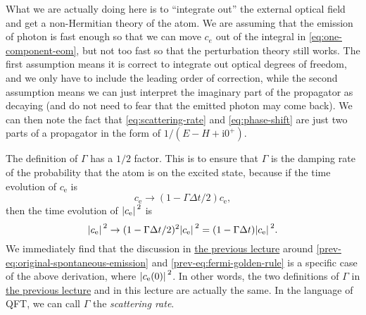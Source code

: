 \documentclass[hyperref, a4paper]{article}
\newcommand*{\ii}{\mathrm{i}}
\newcommand{\prevlecture}{\href{11-18.pdf}{the previous lecture}}
\begin{document}
\begin{note*}{}
    What we are actually doing here is to ``integrate out'' the external optical field and get a non-Hermitian
    theory of the atom. We are assuming that the emission of photon is fast enough so that 
    we can move $c_e$ out of the integral in \eqref{eq:one-component-eom}, but not too fast so that the 
    perturbation theory still works. The first assumption means it is correct to integrate out optical degrees 
    of freedom, and we only have to include the leading order of correction, while the second assumption means 
    we can just interpret the imaginary part of the propagator as decaying (and do not need to fear that the 
    emitted photon may come back). We can then note the fact that \eqref{eq:scattering-rate} and 
    \eqref{eq:phase-shift} are just two parts of a propagator in the form of $1 / (E - H + \ii 0^+)$.

    The definition of $\Gamma$ has a $1/2$ factor. This is to ensure that $\Gamma$ is the damping rate of 
    the probability that the atom is on the excited state, because if the time evolution of $c_\text{e}$ is 
    \[
        c_\text{e} \to (1 - \Gamma \Delta t / 2) c_\text{e},
    \]
    then the time evolution of $\abs*{c_\text{e}}^2$ is 
    \[
        \abs*{c_\text{e}}^2 \to (1 - \Gamma \Delta t / 2)^2 \abs*{c_\text{e}}^2 = (1 - \Gamma \Delta t) \abs*{c_\text{e}}^2.
    \]
    We immediately find that the discussion in \prevlecture{} around \eqref{prev-eq:original-spontaneous-emission}
    and \eqref{prev-eq:fermi-golden-rule} is a specific case of the above derivation, where 
    $\abs*{c_\text{e}(0)}^2$. In other words, the two definitions of $\Gamma$ in \prevlecture{} and in this 
    lecture are actually the same. In the language of QFT, we can call $\Gamma$ the \emph{scattering rate}.
\end{note*}
\end{document}
